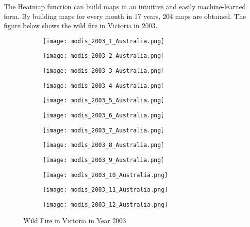 \documentclass[../main]{subfiles}
\begin{document}
The Heatmap function can build maps in an intuitive and easily
machine-learned form. By building maps for every month in 17 years, 204
maps are obtained. The figure below shows the wild fire in Victoria in
2003.

\begin{figure}[h!]
  \centering
\begin{subfigure}[b]{0.25\linewidth}
\texttt{[image: modis\_2003\_1\_Australia.png]}
\end{subfigure}
\begin{subfigure}[b]{0.25\linewidth}
\texttt{[image: modis\_2003\_2\_Australia.png]}
\end{subfigure}
\begin{subfigure}[b]{0.25\linewidth}
\texttt{[image: modis\_2003\_3\_Australia.png]}
\end{subfigure}
\begin{subfigure}[b]{0.25\linewidth}
\texttt{[image: modis\_2003\_4\_Australia.png]}
\end{subfigure}
\begin{subfigure}[b]{0.25\linewidth}
\texttt{[image: modis\_2003\_5\_Australia.png]}
\end{subfigure}
\begin{subfigure}[b]{0.25\linewidth}
\texttt{[image: modis\_2003\_6\_Australia.png]}
\end{subfigure}
\begin{subfigure}[b]{0.25\linewidth}
  \texttt{[image: modis\_2003\_7\_Australia.png]}
  \end{subfigure}
  \begin{subfigure}[b]{0.25\linewidth}
  \texttt{[image: modis\_2003\_8\_Australia.png]}
  \end{subfigure}
  \begin{subfigure}[b]{0.25\linewidth}
  \texttt{[image: modis\_2003\_9\_Australia.png]}
  \end{subfigure}
  \begin{subfigure}[b]{0.25\linewidth}
  \texttt{[image: modis\_2003\_10\_Australia.png]}
  \end{subfigure}
  \begin{subfigure}[b]{0.25\linewidth}
  \texttt{[image: modis\_2003\_11\_Australia.png]}
  \end{subfigure}
  \begin{subfigure}[b]{0.25\linewidth}
  \texttt{[image: modis\_2003\_12\_Australia.png]}
  \end{subfigure}
\caption{Wild Fire in Victoria in Year 2003}
  \label{fig:1-12}
\end{figure}
\end{document}
